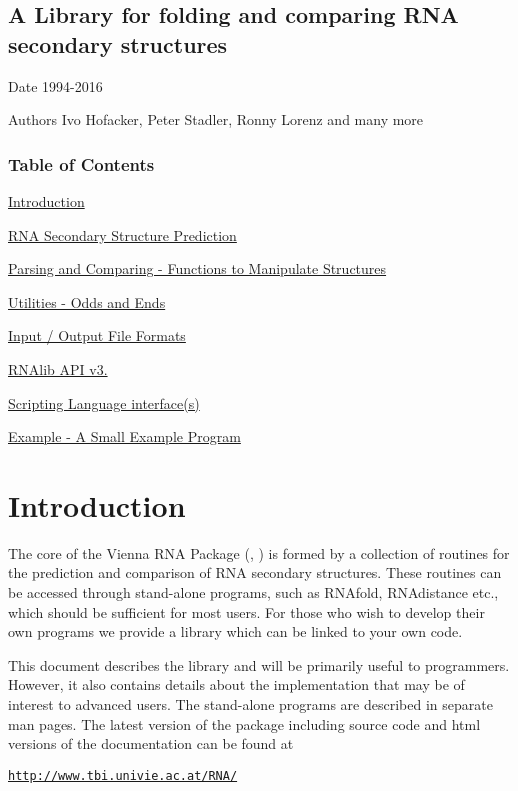 \par
 

\subsection*{A Library for folding and comparing R\-N\-A secondary structures}



\par
 \begin{DoxyDate}{Date}
1994-\/2016 
\end{DoxyDate}
\begin{DoxyAuthor}{Authors}
Ivo Hofacker, Peter Stadler, Ronny Lorenz and many more
\end{DoxyAuthor}
\subsubsection*{Table of Contents}





\begin{DoxyItemize}
\item \hyperlink{index_mp_intro}{Introduction} \item \hyperlink{group__folding__routines}{R\-N\-A Secondary Structure Prediction} \item \hyperlink{mp_parse}{Parsing and Comparing -\/ Functions to Manipulate Structures} \item \hyperlink{mp_utils}{Utilities -\/ Odds and Ends} \item \hyperlink{file_formats}{Input / Output File Formats} \item \hyperlink{newAPI}{R\-N\-Alib A\-P\-I v3.} \item \hyperlink{swig_interface}{Scripting Language interface(s)} \item \hyperlink{mp_example}{Example -\/ A Small Example Program}\end{DoxyItemize}


\hypertarget{index_mp_intro}{}\section{Introduction}\label{index_mp_intro}
The core of the Vienna R\-N\-A Package (\cite{lorenz:2011}, \cite{hofacker:1994}) is formed by a collection of routines for the prediction and comparison of R\-N\-A secondary structures. These routines can be accessed through stand-\/alone programs, such as R\-N\-Afold, R\-N\-Adistance etc., which should be sufficient for most users. For those who wish to develop their own programs we provide a library which can be linked to your own code.

This document describes the library and will be primarily useful to programmers. However, it also contains details about the implementation that may be of interest to advanced users. The stand-\/alone programs are described in separate man pages. The latest version of the package including source code and html versions of the documentation can be found at \par
\par
\href{http://www.tbi.univie.ac.at/RNA/}{\tt http\-://www.\-tbi.\-univie.\-ac.\-at/\-R\-N\-A/} 